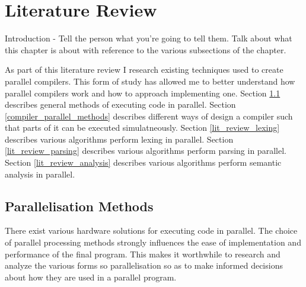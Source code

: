 \chapter{Literature Review} \label{litreview}
\begin{sectionplan}
Introduction - Tell the person what you're going to tell them. Talk about what
this chapter is about with reference to the various subsections of the chapter.
\end{sectionplan}

As part of this literature review I research existing techniques used to create
parallel compilers. This form of study has allowed me to better understand how
parallel compilers work and how to approach implementing one.
\newline \newline
Section \ref{parallelisation_methods} describes general methods of executing
code in parallel.
\newline \newline
Section \ref{compiler_parallel_methods} describes different ways of design a compiler
such that parts of it can be executed simulatneously.
\newline \newline
Section \ref{lit_review_lexing} describes various algorithms perform lexing
in parallel.
\newline \newline
Section \ref{lit_review_parsing} describes various algorithms perform parsing
in parallel.
\newline \newline
Section \ref{lit_review_analysis} describes various algorithms perform semantic
analysis in parallel.
\newline \newline

\section{Parallelisation Methods} \label{parallelisation_methods}
There exist various hardware solutions for executing code in parallel.
The choice of parallel processing methods strongly influences the ease of
implementation and performance of the final program. This makes it worthwhile to
research and analyze the various forms so parallelisation so as to make informed
decisions about how they are used in a parallel program.

